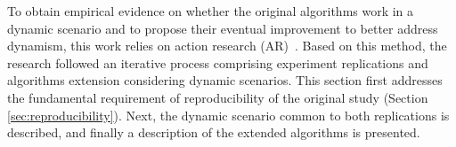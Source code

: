 
To obtain empirical evidence on whether the original algorithms work in a dynamic scenario and to propose their eventual improvement to better address dynamism, this work relies on action research (AR)~\cite{action_research}. Based on this method, the research followed an iterative process comprising experiment replications and algorithms extension considering dynamic scenarios. This section first addresses the fundamental requirement of reproducibility of the original study (Section \ref{sec:reproducibility}). Next, the dynamic scenario common to both replications is described, and finally a description of the  extended algorithms is presented. 
